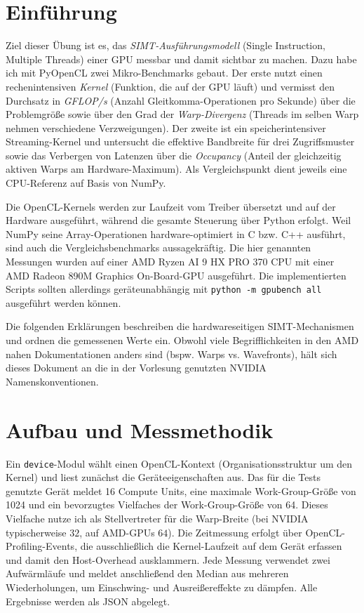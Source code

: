 \documentclass[a4paper, 12pt]{article}
\begin{document}
\section*{Einführung}
Ziel dieser Übung ist es, das \textit{SIMT-Ausführungsmodell} (Single Instruction, Multiple Threads) einer GPU messbar und damit sichtbar zu machen. Dazu habe ich mit PyOpenCL\autocite{pyopencl} zwei Mikro-Benchmarks gebaut. Der erste nutzt einen rechenintensiven \textit{Kernel} (Funktion, die auf der GPU läuft) und vermisst den Durchsatz in \textit{GFLOP/s} (Anzahl Gleitkomma-Operationen pro Sekunde) über die Problemgröße sowie über den Grad der \textit{Warp-Divergenz} (Threads im selben Warp nehmen verschiedene Verzweigungen). Der zweite ist ein speicherintensiver Streaming-Kernel und untersucht die effektive Bandbreite für drei Zugriffsmuster sowie das Verbergen von Latenzen über die \textit{Occupancy} (Anteil der gleichzeitig aktiven Warps am Hardware-Maximum). Als Vergleichspunkt dient jeweils eine CPU-Referenz auf Basis von NumPy.

Die OpenCL-Kernels werden zur Laufzeit vom Treiber übersetzt\autocite{opencl} und auf der Hardware ausgeführt, während die gesamte Steuerung über Python erfolgt. Weil NumPy seine Array-Operationen hardware-optimiert in C bzw. C++ ausführt, sind auch die Vergleichsbenchmarks aussagekräftig. Die hier genannten Messungen wurden auf einer AMD Ryzen AI 9 HX PRO 370 CPU mit einer AMD Radeon 890M Graphics On-Board-GPU ausgeführt. Die implementierten Scripts sollten allerdings geräteunabhängig mit \texttt{python -m gpubench all} ausgeführt werden können.

Die folgenden Erklärungen beschreiben die hardwareseitigen SIMT-Mechanismen und ordnen die gemessenen Werte ein. Obwohl viele Begrifflichkeiten in den AMD nahen Dokumentationen anders sind (bspw. Warps vs. Wavefronts), hält sich dieses Dokument an die in der Vorlesung genutzten NVIDIA Namenskonventionen.

\section*{Aufbau und Messmethodik}
Ein \texttt{device}-Modul wählt einen OpenCL-Kontext (Organisationsstruktur um den Kernel) und liest zunächst die Geräteeigenschaften aus. Das für die Tests genutzte Gerät meldet 16 Compute Units, eine maximale Work-Group-Größe von 1024 und ein bevorzugtes Vielfaches der Work-Group-Größe von 64. Dieses Vielfache nutze ich als Stellvertreter für die Warp-Breite (bei NVIDIA typischerweise $32$, auf AMD-GPUs $64$). Die Zeitmessung erfolgt über OpenCL-Profiling-Events, die ausschließlich die Kernel-Laufzeit auf dem Gerät erfassen und damit den Host-Overhead ausklammern. Jede Messung verwendet zwei Aufwärmläufe und meldet anschließend den Median aus mehreren Wiederholungen, um Einschwing- und Ausreißereffekte zu dämpfen. Alle Ergebnisse werden als JSON abgelegt.
\end{document}
